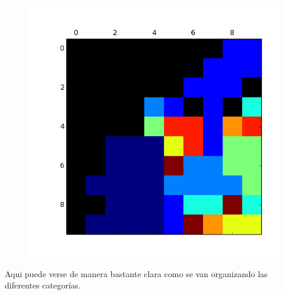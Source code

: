 \begin{figure}[h!]
\begin{minipage}{.15\textwidth}
  \label{fig:test2}
\end{minipage}
\begin{minipage}{.15\textwidth}
  \centering
  \includegraphics[width=.9\linewidth]{img/convergencia_kohonen/entrenamiento_100.png}
  \label{fig:test2}
\end{minipage}
\end{figure}

Aqui puede verse de manera bastante clara como se van organizando las diferentes categorías.